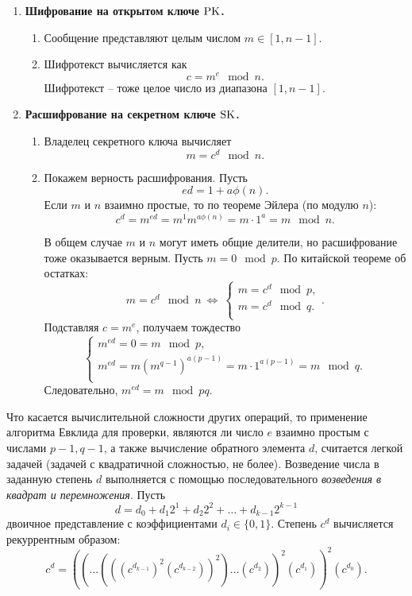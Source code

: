 \begin{enumerate}
    \item \textbf{Шифрование на открытом ключе $\textrm{PK}$.}
        \begin{enumerate}
            \item Сообщение представляют целым числом $m \in [1, n-1]$.
            \item Шифротекст вычисляется как
                \[ c = m^e \mod n. \]
                Шифротекст -- тоже целое число из диапазона $[1, n-1]$.
        \end{enumerate}
    \item \textbf{Расшифрование на секретном ключе $\textrm{SK}$.}
        \begin{enumerate}
            \item Владелец секретного ключа вычисляет
                \[ m = c^d \mod n. \]
            \item Покажем верность расшифрования. Пусть
                \[ ed = 1 + a \phi(n). \]
                Если $m$ и $n$ взаимно простые, то по теореме Эйлера (по модулю $n$):
                \[ c^d = m ^{ed} = m^1 m^{a\phi(n)} = m \cdot 1^a = m \mod n. \]

                В общем случае $m$ и $n$ могут иметь общие делители, но расшифрование тоже оказывается верным. Пусть $m = 0 \mod p$. По китайской теореме об остатках:
                \[
                     m = c^d \mod n ~\Leftrightarrow~
                     \left\{ \begin{array}{l}
                        m = c^d \mod p, \\
                        m = c^d \mod q. \\
                     \end{array} \right..
                \]
                Подставляя $c=m^e$, получаем тождество
                \[ \left\{ \begin{array}{l}
                    m^{ed} = 0 = m \mod p, \\
                    m^{ed} = m  \left( m^{q-1} \right)^{a(p-1)} = m \cdot 1^{a(p-1)} = m \mod q. \\
                \end{array} \right. \]
                Следовательно, $m^{ed} = m \mod pq$.
        \end{enumerate}
\end{enumerate}


Что касается вычислительной сложности других операций, то применение алгоритма Евклида для проверки, являются ли число $e$  взаимно простым с числами $p-1, q-1$, а также вычисление обратного элемента $d$, считается легкой задачей (задачей с квадратичной сложностью, не более).
Возведение числа в заданную степень $d$ выполняется с помощью последовательного \emph{возведения в квадрат и перемножения}. Пусть
    \[ d = d_0 + d_1 2^1 + d_2 2^2 + \ldots + d_{k-1} 2^{k-1} \]
двоичное представление с коэффициентами $d_{i} \in \{ 0, 1 \}$. Степень $c^d$ вычисляется рекуррентным образом:
  \[ c^d =((... (((c^ {d_{k-1}})^2  (c^{d_{k-2}}))^2)\dots(c^{d_2}))^2 (c^{d_1}))^2 (c^{d_0}).\]

